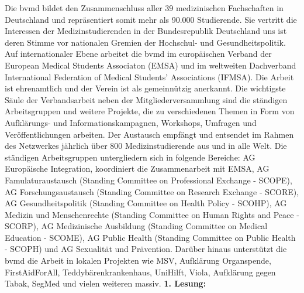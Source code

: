 {    Die bvmd bildet den Zusammenschluss aller 39 medizinischen Fachschaften in Deutschland und repräsentiert somit mehr als 90.000 Studierende. Sie vertritt die Interessen der Medizinstudierenden in der Bundesrepublik Deutschland uns ist deren Stimme vor nationalen Gremien der Hochschul- und Gesundheitspolitik. Auf internationaler Ebene arbeitet die bvmd im europäischen Verband der European Medical Students Associaton (EMSA) und im weltweiten Dachverband International Federation of Medical Students’ Associations (IFMSA). Die Arbeit ist ehrenamtlich und der Verein ist als gemeinnützig anerkannt. Die wichtigste Säule der Verbandsarbeit neben der Mitgliederversammlung sind die ständigen Arbeitsgruppen und weitere Projekte, die zu verschiedenen Themen in Form von Aufklärungs- und Informationskampagnen, Workshops, Umfragen und Veröffentlichungen arbeiten. Der Austausch empfängt und entsendet im Rahmen des Netzwerkes jährlich über 800 Medizinstudierende aus und in alle Welt. Die ständigen Arbeitsgruppen untergliedern sich in folgende Bereiche: AG Europäische Integration, koordiniert die Zusammenarbeit mit EMSA, AG Famulaturaustausch (Standing Committee on Professional Exchange - SCOPE), AG Forschungsaustausch (Standing Committee on Research Exchange - SCORE), AG Gesundheitspolitik (Standing Committee on Health Policy - SCOHP), AG Medizin und Menschenrechte (Standing Committee on Human Rights and Peace - SCORP), AG Medizinische Ausbildung (Standing Committee on Medical Education - SCOME), AG Public Health (Standing Committee on Public Health - SCOPH) und AG Sexualität und Prävention. Darüber hinaus unterstützt die bvmd die Arbeit in lokalen Projekten wie MSV, Aufklärung Organspende, FirstAidForAll, Teddybärenkrankenhaus, UniHilft, Viola, Aufklärung gegen Tabak, SegMed und vielen weiteren massiv.
}{
    \textbf{1. Lesung:}
    \ul{
}}
